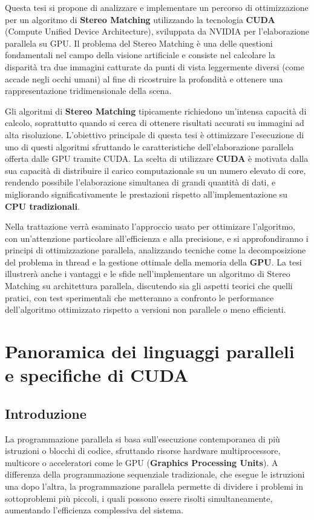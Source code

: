 \documentclass[12pt,a4paper]{report}
\begin{document}
Questa tesi si propone di analizzare e implementare un percorso di ottimizzazione per un algoritmo di \textbf{Stereo Matching} utilizzando la tecnologia \textbf{CUDA} (Compute Unified Device Architecture), sviluppata da NVIDIA per l'elaborazione parallela su GPU. Il problema del Stereo Matching è una delle questioni fondamentali nel campo della visione artificiale e consiste nel calcolare la disparità tra due immagini catturate da punti di vista leggermente diversi (come accade negli occhi umani) al fine di ricostruire la profondità e ottenere una rappresentazione tridimensionale della scena.

Gli algoritmi di \textbf{Stereo Matching} tipicamente richiedono un'intensa capacità di calcolo, soprattutto quando si cerca di ottenere risultati accurati su immagini ad alta risoluzione. L’obiettivo principale di questa tesi è ottimizzare l'esecuzione di uno di questi algoritmi sfruttando le caratteristiche dell'elaborazione parallela offerta dalle GPU tramite CUDA. La scelta di utilizzare \textbf{CUDA} è motivata dalla sua capacità di distribuire il carico computazionale su un numero elevato di core, rendendo possibile l’elaborazione simultanea di grandi quantità di dati, e migliorando significativamente le prestazioni rispetto all'implementazione su \textbf{CPU tradizionali}.

Nella trattazione verrà esaminato l'approccio usato per ottimizare l'algoritmo, con un'attenzione particolare all'efficienza e alla precisione, e si approfondiranno i principi di ottimizzazione parallela, analizzando tecniche come la decomposizione del problema in thread e la gestione ottimale della memoria della \textbf{GPU}. La tesi illustrerà anche i vantaggi e le sfide nell'implementare un algoritmo di Stereo Matching su architettura parallela, discutendo sia gli aspetti teorici che quelli pratici, con test sperimentali che metteranno a confronto le performance dell'algoritmo ottimizzato rispetto a versioni non parallele o meno efficienti.



\chapter{Panoramica dei linguaggi paralleli e specifiche di CUDA}

\section{Introduzione}

La programmazione parallela si basa sull’esecuzione contemporanea di più istruzioni o blocchi di codice, sfruttando risorse hardware multiprocessore, multicore o acceleratori come le GPU (\textbf{Graphics Processing Units}). A differenza della programmazione sequenziale tradizionale, che esegue le istruzioni una dopo l’altra, la programmazione parallela permette di dividere i problemi in sottoproblemi più piccoli, i quali possono essere risolti simultaneamente, aumentando l’efficienza complessiva del sistema.
\end{document}
